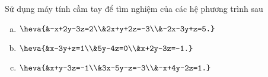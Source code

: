 \begin{bt}
	Sử dụng máy tính cầm tay để tìm nghiệm của các hệ phương trình sau
	\begin{enumerate}[a)]
		\item $\heva{&-x+2y-3z=2\\&2x+y+2z=-3\\&-2x-3y+z=5.}$
		\item $\heva{&x-3y+z=1\\&5y-4z=0\\&x+2y-3z=-1.}$
		\item $\heva{&x+y-3z=-1\\&3x-5y-z=-3\\&-x+4y-2z=1.}$
	\end{enumerate}
\end{bt}





